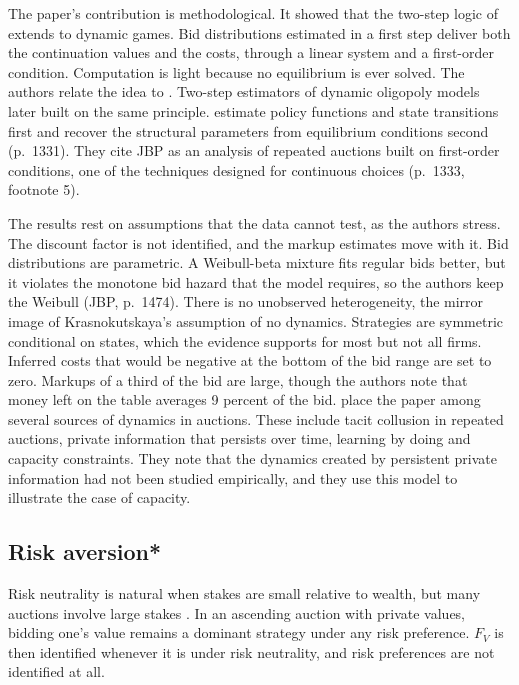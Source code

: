 The paper's contribution is methodological. It showed that the two-step logic of \citet{GuerrePerrigneVuong2000}
extends to dynamic games. Bid distributions estimated in a first step deliver both the continuation values
and the costs, through a linear system and a first-order condition. Computation is light because no
equilibrium is ever solved. The authors relate the idea to \citet{HotzMiller1993}. Two-step estimators
of dynamic oligopoly models later built on the same principle. \citet{BajariBenkardLevin2007} estimate
policy functions and state transitions first and recover the structural parameters from equilibrium
conditions second (p.~1331). They cite JBP as an analysis of repeated auctions built on first-order
conditions, one of the techniques designed for continuous choices (p.~1333, footnote 5).

The results rest on assumptions that the data cannot test, as the authors stress. The discount factor is
not identified, and the markup estimates move with it. Bid distributions are parametric. A Weibull-beta
mixture fits regular bids better, but it violates the monotone bid hazard that the model requires, so the
authors keep the Weibull (JBP, p.~1474). There is no
unobserved heterogeneity, the mirror image of Krasnokutskaya's assumption of no dynamics. Strategies are
symmetric conditional on states, which the evidence supports for most but not all firms. Inferred costs
that would be negative at the bottom of the bid range are set to zero. Markups of a third of the bid are
large, though the authors note that money left on the table averages 9 percent of the bid.
\citet[Section 9]{AtheyHaile2007} place the paper among several sources of dynamics in auctions. These
include tacit collusion in repeated auctions, private information that persists over time, learning by
doing and capacity constraints. They note that the dynamics created by persistent private information had
not been studied empirically, and they use this model to illustrate the case of capacity.

\subsection{Risk aversion*}\label{sec:15-risk}

Risk neutrality is natural when stakes are small relative to wealth, but many auctions involve large
stakes \citep[Section 6.4]{AtheyHaile2007}. In an ascending auction with private values, bidding one's
value remains a dominant strategy under any risk preference. $F_V$ is then identified whenever it is under
risk neutrality, and risk preferences are not identified at all.

